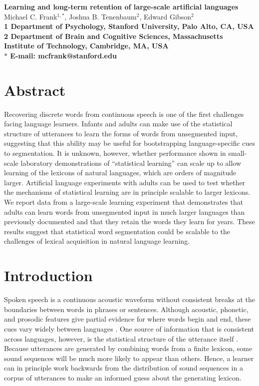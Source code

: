 \documentclass[10pt]{article}
\date{}
\begin{document}
\begin{flushleft}
{\Large
\textbf{Learning and long-term retention of large-scale artificial languages}
}
\\
Michael C. Frank$^{1,\ast}$, 
 Joshua B. Tenenbaum$^{2}$, 
Edward Gibson$^{2}$
\\
\bf{1} Department of Psychology, Stanford University, Palo Alto, CA, USA
\\
\bf{2} Department of Brain and Cognitive Sciences, Massachusetts Institute of Technology, Cambridge, MA, USA
\\
$\ast$ E-mail: mcfrank@stanford.edu
\end{flushleft}

\section*{Abstract}

Recovering discrete words from continuous speech is one of the first challenges facing language learners. Infants and adults can make use of the statistical structure of utterances to learn the forms of words from unsegmented input, suggesting that this ability may be useful for bootstrapping language-specific cues to segmentation. It is unknown, however, whether performance shown in small-scale laboratory demonstrations of ``statistical learning'' can scale up to allow learning of the lexicons of natural languages, which are orders of magnitude larger. Artificial language experiments with adults can be used to test whether the mechanisms of statistical learning are in principle scalable to larger lexicons. We report data from a large-scale learning experiment that demonstrates that adults can learn words from unsegmented input in much larger languages than previously documented and that they retain the words they learn for years. These results suggest that statistical word segmentation could be scalable to the challenges of lexical acquisition in natural language learning.

\section*{Introduction}

Spoken speech is a continuous acoustic waveform without consistent breaks at the boundaries between words in phrases or sentences. Although acoustic, phonetic, and prosodic features give partial evidence for where words begin and end, these cues vary widely between languages \cite{jusczyk2000}. One source of information that is consistent across languages, however, is the statistical structure of the utterance itself \cite{harris1951}. Because utterances are generated by combining words from a finite lexicon, some sound sequences will be much more likely to appear than others. Hence, a learner can in principle work backwards from the distribution of sound sequences in a corpus of utterances to make an informed guess about the generating lexicon. 
\end{document}
